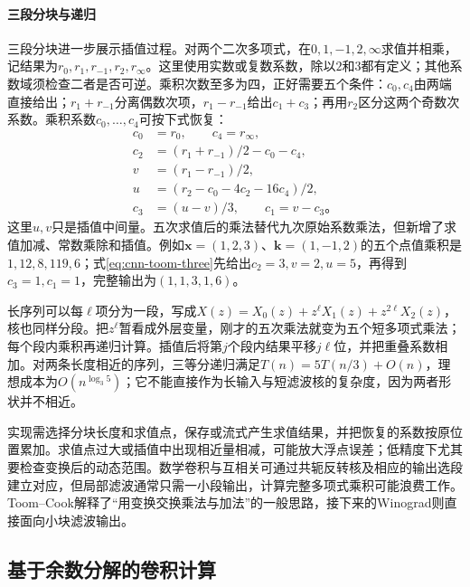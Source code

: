 \paragraph{三段分块与递归}

三段分块进一步展示插值过程。对两个二次多项式，在$0,1,-1,2,\infty$求值并相乘，记结果为$r_0,r_1,r_{-1},r_2,r_\infty$。这里使用实数或复数系数，除以$2$和$3$都有定义；其他系数域须检查二者是否可逆。乘积次数至多为四，正好需要五个条件：$c_0,c_4$由两端直接给出；$r_1+r_{-1}$分离偶数次项，$r_1-r_{-1}$给出$c_1+c_3$；再用$r_2$区分这两个奇数次系数。乘积系数$c_0,\ldots,c_4$可按下式恢复：
\begin{equation}
  \begin{aligned}
    c_0&=r_0,\qquad c_4=r_\infty,\\
    c_2&=(r_1+r_{-1})/2-c_0-c_4,\\
    v&=(r_1-r_{-1})/2,\\
    u&=(r_2-c_0-4c_2-16c_4)/2,\\
    c_3&=(u-v)/3,\qquad c_1=v-c_3\text{。}
  \end{aligned}
  \label{eq:cnn-toom-three}
\end{equation}
这里$u,v$只是插值中间量。五次求值后的乘法替代九次原始系数乘法，但新增了求值加减、常数乘除和插值。例如$\bm x=(1,2,3)$、$\bm k=(1,-1,2)$的五个点值乘积是$1,12,8,119,6$；式\eqref{eq:cnn-toom-three}先给出$c_2=3,v=2,u=5$，再得到$c_3=1,c_1=1$，完整输出为$(1,1,3,1,6)$。

长序列可以每$\ell$项分为一段，写成$X(z)=X_0(z)+z^\ell X_1(z)+z^{2\ell}X_2(z)$，核也同样分段。把$z^\ell$暂看成外层变量，刚才的五次乘法就变为五个短多项式乘法；每个段内乘积再递归计算。插值后将第$j$个段内结果平移$j\ell$位，并把重叠系数相加。对两条长度相近的序列，三等分递归满足$T(n)=5T(n/3)+O(n)$，理想成本为$O(n^{\log_3 5})$；它不能直接作为长输入与短滤波核的复杂度，因为两者形状并不相近。

实现需选择分块长度和求值点，保存或流式产生求值结果，并把恢复的系数按原位置累加。求值点过大或插值中出现相近量相减，可能放大浮点误差；低精度下尤其要检查变换后的动态范围。数学卷积与互相关可通过共轭反转核及相应的输出选段建立对应，但局部滤波通常只需一小段输出，计算完整多项式乘积可能浪费工作。Toom--Cook解释了“用变换交换乘法与加法”的一般思路，接下来的Winograd则直接面向小块滤波输出。

\subsection{基于余数分解的卷积计算}\label{sec:signal-analysis-fast-winograd}\label{sec:cnn-winograd}

